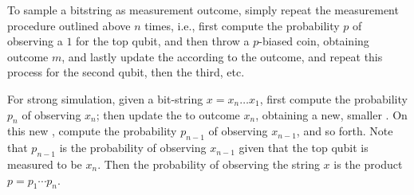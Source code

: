 To sample a bitstring as measurement outcome, simply repeat the measurement procedure outlined above $n$ times, i.e., first compute the probability $p$ of observing a $1$ for the top qubit, and then throw a $p$-biased coin, obtaining outcome $m$, and lastly update the \limdd according to the outcome, and repeat this process for the second qubit, then the third, etc.

For strong simulation, given a bit-string $x=x_n\ldots x_1$, first compute the probability $p_n$ of observing $x_n$; then update the \limdd to outcome $x_n$, obtaining a new, smaller \limdd.
On this new \limdd, compute the probability $p_{n-1}$ of observing $x_{n-1}$, and so forth.
Note that $p_{n-1}$ is the probability of observing $x_{n-1}$ given that the top qubit is measured to be $x_n$.
Then the probability of observing the string $x$ is the product $p=p_1\cdots p_n$.




